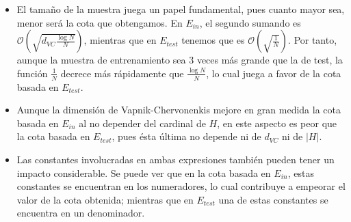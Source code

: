\documentclass[10pt,a4paper]{article}
\begin{document}
\begin{itemize}
	\item El tamaño de la muestra juega un papel fundamental, pues cuanto mayor sea, menor será la cota que obtengamos. En $E_{in}$, el segundo sumando es $\mathcal{O} \left( \sqrt{d_{VC}\frac{\log{N}}{N}} \right)$, mientras que en $E_{test}$ tenemos que es $\mathcal{O} \left( \sqrt{\frac{1}{N}} \right)$. Por tanto, aunque la muestra de entrenamiento sea 3 veces más grande que la de test, la función $\frac{1}{N}$ decrece más rápidamente que $\frac{\log{N}}{N}$, lo cual juega a favor de la cota basada en $E_{test}$.
	\item Aunque la dimensión de Vapnik-Chervonenkis mejore en gran medida la cota basada en $E_{in}$ al no depender del cardinal de $H$, en este aspecto es peor que la cota basada en $E_{test}$, pues ésta última no depende ni de $d_{VC}$ ni de $|H|$.
	\item Las constantes involucradas en ambas expresiones también pueden tener un impacto considerable. Se puede ver que en la cota basada en $E_{in}$, estas constantes se encuentran en los numeradores, lo cual contribuye a empeorar el valor de la cota obtenida; mientras que en $E_{test}$ una de estas constantes se encuentra en un denominador.
\end{itemize}
\end{document}

